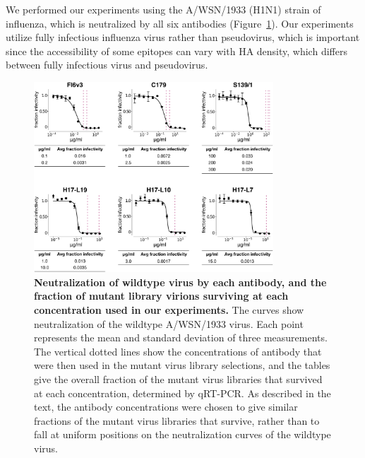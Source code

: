 \documentclass[11pt]{article}
\begin{document}
We performed our experiments using the A/WSN/1933 (H1N1) strain of influenza, which is neutralized by all six antibodies (Figure~\ref{fig:neutcurves}).
Our experiments utilize fully infectious influenza virus rather than pseudovirus, which is important since the accessibility of some epitopes can vary with HA density, which differs between fully infectious virus and pseudovirus\cite{corti2011neutralizing,joyce2016vaccine}.

\begin{figure}
\centerline{\includegraphics[width=0.8\textwidth]{figs/neutralization_curves/WT_neutralization_curves.pdf}}
\caption{\label{fig:neutcurves}
{\bf Neutralization of wildtype virus by each antibody, and the fraction of mutant library virions surviving at each concentration used in our experiments.}
The curves show neutralization of the wildtype A/WSN/1933 virus. 
Each point represents the mean and standard deviation of three measurements. 
The vertical dotted lines show the concentrations of antibody that were then used in the mutant virus library selections, and the tables give the overall fraction of the mutant virus libraries that survived at each concentration, determined by qRT-PCR.
As described in the text, the antibody concentrations were chosen to give similar fractions of the mutant virus libraries that survive, rather than to fall at uniform positions on the neutralization curves of the wildtype virus.
}
\end{figure}
\end{document}
